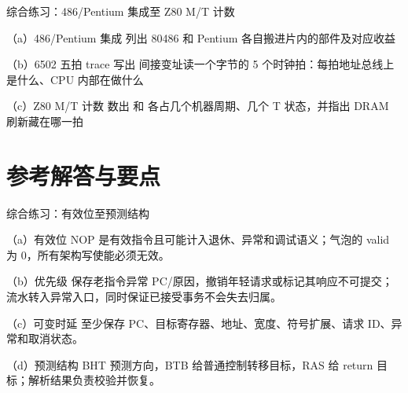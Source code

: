 \begin{chapterexercise}{综合练习：486/Pentium 集成至 Z80 M/T 计数}
\begin{exercisesubproblem}{（a）486/Pentium 集成}
列出 80486 和 Pentium 各自搬进片内的部件及对应收益
\end{exercisesubproblem}
\begin{exercisesubproblem}{（b）6502 五拍 trace}
写出  间接变址读一个字节的 5 个时钟拍：每拍地址总线上是什么、CPU 内部在做什么
\end{exercisesubproblem}
\begin{exercisesubproblem}{（c）Z80 M/T 计数}
数出  和  各占几个机器周期、几个 T 状态，并指出 DRAM 刷新藏在哪一拍
\end{exercisesubproblem}
\end{chapterexercise}

\section*{参考解答与要点}

\begin{chapteranswer}{综合练习：有效位至预测结构}
\begin{answersubproblem}{（a）有效位}
NOP 是有效指令且可能计入退休、异常和调试语义；气泡的 valid 为 0，所有架构写使能必须无效。
\end{answersubproblem}
\begin{answersubproblem}{（b）优先级}
保存老指令异常 PC/原因，撤销年轻请求或标记其响应不可提交；流水转入异常入口，同时保证已接受事务不会失去归属。
\end{answersubproblem}
\begin{answersubproblem}{（c）可变时延}
至少保存 PC、目标寄存器、地址、宽度、符号扩展、请求 ID、异常和取消状态。
\end{answersubproblem}
\begin{answersubproblem}{（d）预测结构}
BHT 预测方向，BTB 给普通控制转移目标，RAS 给 return 目标；解析结果负责校验并恢复。
\end{answersubproblem}
\end{chapteranswer}

